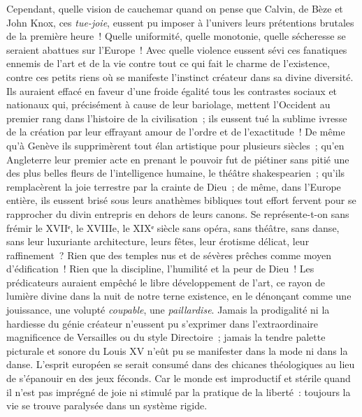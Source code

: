 \documentclass[french,twoside]{book} %
\begin{document}
Cependant, quelle vision de cauchemar quand on pense que Calvin, de Bèze et John Knox, ces \emph{tue-joie}, eussent pu imposer à l’univers leurs prétentions brutales de la première heure ! Quelle uniformité, quelle monotonie, quelle sécheresse se seraient abattues sur l’Europe ! Avec quelle violence eussent sévi ces fanatiques ennemis de l’art et de la vie contre tout ce qui fait le charme de l’existence, contre ces petits riens où se manifeste l’instinct créateur dans sa divine diversité. Ils auraient effacé en faveur d’une froide égalité tous les contrastes sociaux et nationaux qui, précisément à cause de leur bariolage, mettent l’Occident au premier rang dans l’histoire de la civilisation ; ils eussent tué la sublime ivresse de la création par leur effrayant amour de l’ordre et de l’exactitude ! De même qu’à Genève ils supprimèrent tout élan artistique pour plusieurs siècles ; qu’en Angleterre leur premier acte en prenant le pouvoir fut de piétiner sans pitié une des plus belles fleurs de l’intelligence humaine, le théâtre shakespearien ; qu’ils remplacèrent la joie terrestre par la crainte de Dieu ; de même, dans l’Europe entière, ils eussent brisé sous leurs anathèmes bibliques tout effort fervent pour se rapprocher du divin entrepris en dehors de leurs canons. Se représente-t-on sans frémir le XVIIᵉ, le XVIIIe, le XIXᵉ siècle sans opéra, sans théâtre, sans danse, sans leur luxuriante architecture, leurs fêtes, leur érotisme délicat, leur raffinement ? Rien que des temples nus et de sévères prêches comme moyen d’édification ! Rien que la discipline, l’humilité et la peur de Dieu ! Les prédicateurs auraient empêché le libre développement de l’art, ce rayon de lumière divine dans la nuit de notre terne existence, en le dénonçant comme une jouissance, une volupté \emph{coupable}, une \emph{paillardise}. Jamais la prodigalité ni la hardiesse du génie créateur n’eussent pu s’exprimer dans l’extraordinaire magnificence de Versailles ou du style Directoire ; jamais la tendre palette picturale et sonore du Louis XV n’eût pu se manifester dans la mode ni dans la danse. L’esprit européen se serait consumé dans des chicanes théologiques au lieu de s’épanouir en des jeux féconds. Car le monde est improductif et stérile quand il n’est pas imprégné de joie ni stimulé par la pratique de la liberté : toujours la vie se trouve paralysée dans un système rigide.\par
\end{document}
